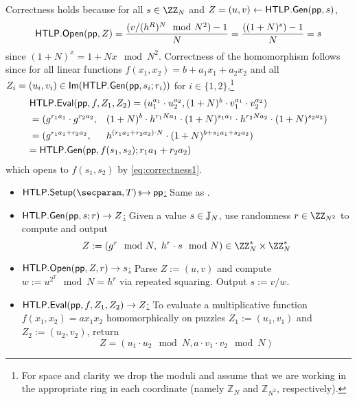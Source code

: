 \noindent Correctness holds because for all $s \in \ZZ_N$ and $Z = (u,v) \gets \mathsf{HTLP}.{\sf Gen}(\mathsf{pp}, s)$,
\begin{equation}\label{eq:correctness1}
\mathsf{HTLP}.\mathsf{Open}(\mathsf{pp}, Z) = \frac{(v/(h^R)^N \mod{N^2})-1}{N} = \frac{((1+N)^s) - 1}{N} = s
\end{equation}
since $(1+N)^x = 1+Nx \mod{N^2}$.
Correctness of the homomorphism follows since for all linear functions $f(x_1, x_2) = b + a_1 x_1 + a_2 x_2$ and all $Z_i = (u_i, v_i) \in {\sf Im}(\mathsf{HTLP}.{\sf Gen}(\mathsf{pp}, s_i; r_i))$ for $i \in \{1,2\}$,\footnote{For space and clarity we drop the moduli and assume that we are working in the appropriate ring in each coordinate (namely $\mathbb{Z}_N$ and $\mathbb{Z}_{N^2}$, respectively).}
\begin{align*}
&\htlp\rlap{$.{\sf Eval}(\pparam, f, Z_1, Z_2) = (u_1^{a_1} \cdot u_2^{a_2}, (1+N)^b \cdot v_1^{a_1} \cdot v_2^{a_2})$} && \\
&= (g^{r_1 a_1} \cdot g^{r_2 a_2}, &&(1+N)^b \cdot h^{r_1 N a_1} \cdot (1+N)^{s_1 a_1} \cdot h^{r_2 N a_2} \cdot (1+N)^{s_2 a_2})\\
&= (g^{r_1 a_1 + r_2 a_2},         &&h^{(r_1 a_1 + r_2 a_2) \cdot N} \cdot (1+N)^{b + s_1 a_1 + s_2 a_2}) \\
&\rlap{$= \htlp.{\sf Gen}(\pparam, f(s_1, s_2); r_1 a_1 + r_2 a_2)$} &&
\end{align*}
which opens to $f(s_1, s_2)$ by \cref{eq:correctness1}.


    \begin{construction}\label{con:multHTLP}
    \hfill
    \begin{itemize}
        \item \underline{$\htlp.\Setup(\secparam, \Ttime) \randout \pparam$:} Same as .
        \item \underline{$\mathsf{HTLP}.{\sf Gen}(\mathsf{pp}, s; r) \rightarrow Z$:} Given a value $s \in \mathbb{J}_N$, use randomness $r \in \ZZ_{N^2}$ to compute and output
            $$Z := (g^r \mod{N},\ h^r \cdot s \mod{N}) \in \ZZ_N^* \times \ZZ_N^*$$
        \item \underline{$\mathsf{HTLP}.\mathsf{Open}(\mathsf{pp}, Z, r) \rightarrow s$:} Parse $Z := (u,v)$ and compute $w := u^{2^T} \mod{N} \allowbreak= h^r$ via repeated squaring. Output $s := v/w$.
        \item \underline{$\mathsf{HTLP}.{\sf Eval}(\mathsf{pp}, f, Z_1, Z_2) \rightarrow Z$:} To evaluate a multiplicative function $f(x_1, x_2) \allowbreak= a x_1 x_2$ homomorphically on puzzles $Z_1 := (u_1, v_1)$ and $Z_2 := (u_2, v_2)$, return
        $$Z = (u_1 \cdot u_2 \mod{N}, a \cdot v_1 \cdot v_2 \mod{N})$$
    \end{itemize}
    \end{construction}


